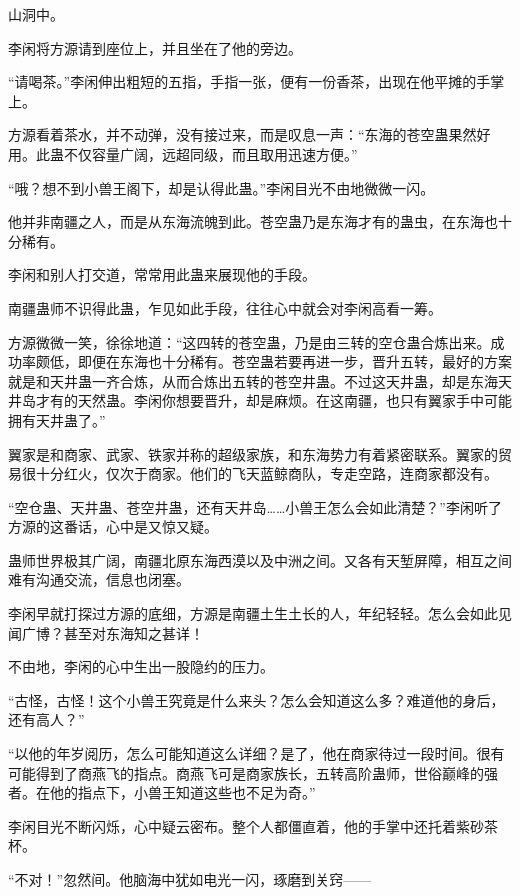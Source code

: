 
\begin{this_body}

山洞中。

李闲将方源请到座位上，并且坐在了他的旁边。

“请喝茶。”李闲伸出粗短的五指，手指一张，便有一份香茶，出现在他平摊的手掌上。

方源看着茶水，并不动弹，没有接过来，而是叹息一声：“东海的苍空蛊果然好用。此蛊不仅容量广阔，远超同级，而且取用迅速方便。”

“哦？想不到小兽王阁下，却是认得此蛊。”李闲目光不由地微微一闪。

他并非南疆之人，而是从东海流魄到此。苍空蛊乃是东海才有的蛊虫，在东海也十分稀有。

李闲和别人打交道，常常用此蛊来展现他的手段。

南疆蛊师不识得此蛊，乍见如此手段，往往心中就会对李闲高看一筹。

方源微微一笑，徐徐地道：“这四转的苍空蛊，乃是由三转的空仓蛊合炼出来。成功率颇低，即便在东海也十分稀有。苍空蛊若要再进一步，晋升五转，最好的方案就是和天井蛊一齐合炼，从而合炼出五转的苍空井蛊。不过这天井蛊，却是东海天井岛才有的天然蛊。李闲你想要晋升，却是麻烦。在这南疆，也只有翼家手中可能拥有天井蛊了。”

翼家是和商家、武家、铁家并称的超级家族，和东海势力有着紧密联系。翼家的贸易很十分红火，仅次于商家。他们的飞天蓝鲸商队，专走空路，连商家都没有。

“空仓蛊、天井蛊、苍空井蛊，还有天井岛……小兽王怎么会如此清楚？”李闲听了方源的这番话，心中是又惊又疑。

蛊师世界极其广阔，南疆北原东海西漠以及中洲之间。又各有天堑屏障，相互之间难有沟通交流，信息也闭塞。

李闲早就打探过方源的底细，方源是南疆土生土长的人，年纪轻轻。怎么会如此见闻广博？甚至对东海知之甚详！

不由地，李闲的心中生出一股隐约的压力。

“古怪，古怪！这个小兽王究竟是什么来头？怎么会知道这么多？难道他的身后，还有高人？”

“以他的年岁阅历，怎么可能知道这么详细？是了，他在商家待过一段时间。很有可能得到了商燕飞的指点。商燕飞可是商家族长，五转高阶蛊师，世俗巅峰的强者。在他的指点下，小兽王知道这些也不足为奇。”

李闲目光不断闪烁，心中疑云密布。整个人都僵直着，他的手掌中还托着紫砂茶杯。

“不对！”忽然间。他脑海中犹如电光一闪，琢磨到关窍——


\end{this_body}
